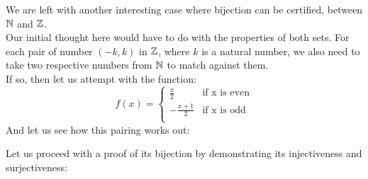 We are left with another interesting case where bijection can be certified, between $\mathbb{N}$ and $\mathbb{Z}$. \\
Our initial thought here would have to do with the properties of both sets. For each pair of number $(-k, k)$ in $\mathbb{Z}$, where $k$ is a natural number, we also need to take two respective numbers from $\mathbb{N}$ to match against them. \\
If so, then let us attempt with the function:
\[
    f(x) = 
    \begin{cases}
        \frac{x}{2} &\text{if x is even} \\
        -\frac{x + 1}{2} &\text{if x is odd} \\
    \end{cases}
\]
And let us see how this pairing works out:
\begin{center}
\end{center}
Let us proceed with a proof of its bijection by demonstrating its injectiveness and surjectiveness:

